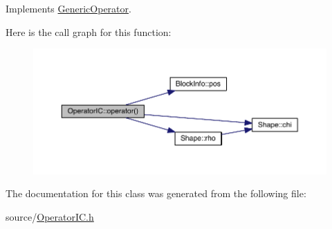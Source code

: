 Implements \hyperlink{class_generic_operator_aacd69e70a1e2d75b97358fca48689a67}{Generic\+Operator}.



Here is the call graph for this function\+:\nopagebreak
\begin{figure}[H]
\begin{center}
\leavevmode
\includegraphics[width=350pt]{de/d4a/class_operator_i_c_adf547defe5168b4bb0181df741a71144_cgraph}
\end{center}
\end{figure}




The documentation for this class was generated from the following file\+:\begin{DoxyCompactItemize}
\item 
source/\hyperlink{_operator_i_c_8h}{Operator\+I\+C.\+h}\end{DoxyCompactItemize}
